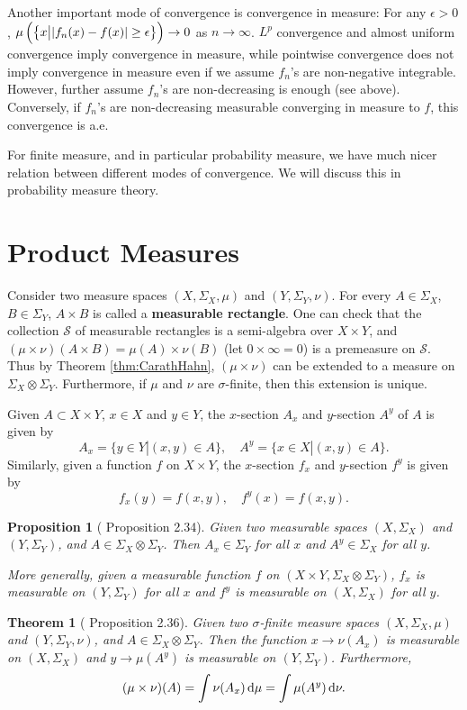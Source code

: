 \documentclass[openany]{book}
\newtheorem{proposition}{Proposition}[chapter]
\newtheorem{theorem}{Theorem}[chapter]
\theoremstyle{definition}
\theoremstyle{remark}
\begin{document}
Another important mode of convergence is convergence in measure: For any $\epsilon>0$, $\mu\del{\cbr{x\middle||f_n(x)-f(x)|\ge\epsilon}}\to0$ as $n\to\infty$. $L^p$ convergence and almost uniform convergence imply convergence in measure, while pointwise convergence does not imply convergence in measure even if we assume $f_n$'s are non-negative integrable. However, further assume $f_n$'s are non-decreasing is enough (see above). Conversely, if $f_n$'s are non-decreasing measurable converging in measure to $f$, this convergence is a.e.

For finite measure, and in particular probability measure, we have much nicer relation between different modes of convergence. We will discuss this in probability measure theory.

\section{Product Measures}
Consider two measure spaces $(X,\Sigma_X,\mu)$ and $(Y,\Sigma_Y,\nu)$. For every $A\in\Sigma_X$, $B\in\Sigma_Y$, $A\times B$ is called a \textbf{measurable rectangle}. One can check that the collection $\mathcal{S}$ of measurable rectangles is a semi-algebra over $X\times Y$, and $(\mu\times\nu)(A\times B)=\mu(A)\times\nu(B)$ (let $0\times\infty=0$) is a premeasure on $\mathcal{S}$. Thus by Theorem \ref{thm:CarathHahn}, $(\mu\times\nu)$ can be extended to a measure on $\Sigma_X\otimes\Sigma_Y$. Furthermore, if $\mu$ and $\nu$ are $\sigma$-finite, then this extension is unique.

Given $A\subset X\times Y$, $x\in X$ and $y\in Y$, the $x$-section $A_x$ and $y$-section $A^y$ of $A$ is given by
\begin{equation*}
    A_x=\{y\in Y|(x,y)\in A\},\quad A^y=\{x\in X|(x,y)\in A\}.
\end{equation*}
Similarly, given a function $f$ on $X\times Y$, the $x$-section $f_x$ and $y$-section $f^y$ is given by
\begin{equation*}
    f_x(y)=f(x,y),\quad f^y(x)=f(x,y).
\end{equation*}
\begin{proposition}[\cite{F13} Proposition 2.34]
    Given two measurable spaces $(X,\Sigma_X)$ and $(Y,\Sigma_Y)$, and $A\in\Sigma_X\otimes\Sigma_Y$. Then $A_x\in\Sigma_Y$ for all $x$ and $A^y\in\Sigma_X$ for all $y$.

    More generally, given a measurable function $f$ on $(X\times Y,\Sigma_X\otimes\Sigma_Y)$, $f_x$ is measurable on $(Y,\Sigma_Y)$ for all $x$ and $f^y$ is measurable on $(X,\Sigma_X)$ for all $y$.
\end{proposition}
\begin{theorem}[\cite{F13} Proposition 2.36]
    Given two $\sigma$-finite measure spaces $(X,\Sigma_X,\mu)$ and $(Y,\Sigma_Y,\nu)$, and $A\in\Sigma_X\otimes\Sigma_Y$. Then the function $x\to\nu(A_x)$ is measurable on $(X,\Sigma_X)$ and $y\to\mu(A^y)$ is measurable on $(Y,\Sigma_Y)$. Furthermore,
    \begin{equation*}
        (\mu\times\nu)(A)=\int\nu(A_x)\dif\mu=\int\mu(A^y)\dif\nu.
    \end{equation*}
\end{theorem}
\end{document}
